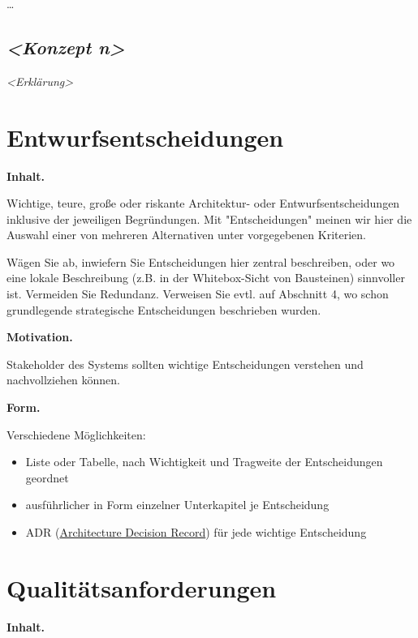 \documentclass[]{article}
\begin{document}
\ldots{}

\subsection{\texorpdfstring{\emph{\textless{}Konzept
n\textgreater{}}}{\textless{}Konzept n\textgreater{}}}\label{__emphasis_konzept_n_emphasis}

\emph{\textless{}Erklärung\textgreater{}}

\section{Entwurfsentscheidungen}\label{section-design-decisions}

\textbf{Inhalt.}

Wichtige, teure, große oder riskante Architektur- oder
Entwurfsentscheidungen inklusive der jeweiligen Begründungen. Mit
"Entscheidungen" meinen wir hier die Auswahl einer von mehreren
Alternativen unter vorgegebenen Kriterien.

Wägen Sie ab, inwiefern Sie Entscheidungen hier zentral beschreiben,
oder wo eine lokale Beschreibung (z.B. in der Whitebox-Sicht von
Bausteinen) sinnvoller ist. Vermeiden Sie Redundanz. Verweisen Sie evtl.
auf Abschnitt 4, wo schon grundlegende strategische Entscheidungen
beschrieben wurden.

\textbf{Motivation.}

Stakeholder des Systems sollten wichtige Entscheidungen verstehen und
nachvollziehen können.

\textbf{Form.}

Verschiedene Möglichkeiten:

\begin{itemize}
\item
  Liste oder Tabelle, nach Wichtigkeit und Tragweite der Entscheidungen
  geordnet
\item
  ausführlicher in Form einzelner Unterkapitel je Entscheidung
\item
  ADR
  (\href{http://thinkrelevance.com/blog/2011/11/15/documenting-architecture-decisions}{Architecture
  Decision Record}) für jede wichtige Entscheidung
\end{itemize}

\section{Qualitätsanforderungen}\label{section-quality-scenarios}

\textbf{Inhalt.}
\end{document}

